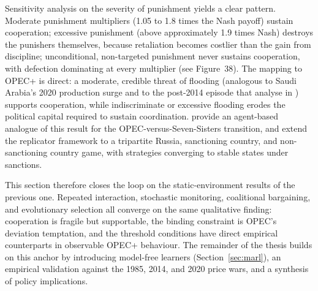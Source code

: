Sensitivity analysis on the severity of punishment yields a clear
pattern. Moderate punishment multipliers (1.05 to 1.8 times the Nash
payoff) sustain cooperation; excessive punishment (above approximately
1.9 times Nash) destroys the punishers themselves, because retaliation
becomes costlier than the gain from discipline; unconditional,
non-targeted punishment never sustains cooperation, with defection
dominating at every multiplier (see Figure~38). The mapping to OPEC+ is
direct: a moderate, credible threat of flooding (analogous to Saudi
Arabia's 2020 production surge and to the post-2014 episode that
\citet{beharritz2017} analyse in ) supports cooperation,
while indiscriminate or excessive flooding erodes the political capital
required to sustain coordination. \citet{wood2016} provide an
agent-based analogue of this result for the OPEC-versus-Seven-Sisters
transition, and \citet{xinzhang2023} extend the replicator framework to
a tripartite Russia, sanctioning country, and non-sanctioning country
game, with strategies converging to stable states under sanctions.

This section therefore closes the loop on the static-environment
results of the previous one. Repeated interaction, stochastic
monitoring, coalitional bargaining, and evolutionary selection all
converge on the same qualitative finding: cooperation is fragile but
supportable, the binding constraint is OPEC's deviation temptation,
and the threshold conditions have direct empirical counterparts in
observable OPEC+ behaviour. The remainder of the thesis builds on this
anchor by introducing model-free learners (Section~\ref{sec:marl}), an empirical
validation against the 1985, 2014, and 2020 price wars, and a synthesis
of policy implications.
